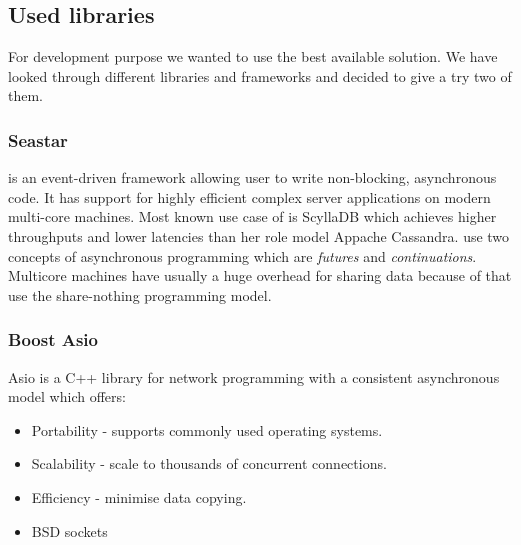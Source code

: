     \subsection{Used libraries}
        For development purpose we wanted to use the best available solution.
        We have looked through different libraries and frameworks and decided to give a try two of them.
        \subsubsection{Seastar}
            \Seastar\cite{Seastar} is an event-driven framework allowing user to write non-blocking, asynchronous code.
            It has support for highly efficient complex server applications on modern multi-core machines.
            Most known use case of \Seastar is ScyllaDB\cite{ScyllaDB} which achieves higher throughputs and lower latencies than her role model Appache Cassandra\cite{Cassandra}.
            \Seastar use two concepts of asynchronous programming which are \textit{futures} and \textit{continuations}.
            Multicore machines have usually a huge overhead for sharing data because of that \Seastar use the share-nothing programming model.
            
            
        \subsubsection{Boost Asio}
            Asio\cite{Asio} is a C++ library for network programming with a consistent asynchronous model which offers:
            \begin{itemize}
                \item Portability - supports commonly used operating systems.
                \item Scalability - scale to thousands of concurrent connections.
                \item Efficiency - minimise data copying.
                \item BSD sockets
            \end{itemize}

